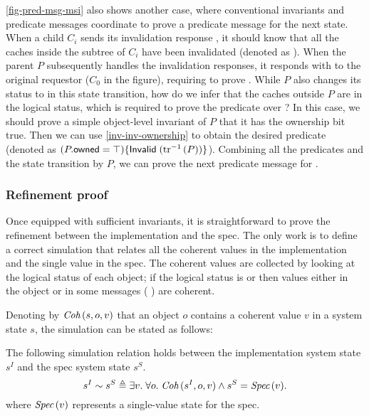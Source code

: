 \autoref{fig-pred-msg-msi} also shows another case, where conventional invariants and predicate messages coordinate to prove a predicate message for the next state.
When a child $C_i$ sends its invalidation response , it should know that all the caches inside the subtree of $C_i$ have been invalidated (denoted as {\color{myblue} }).
When the parent $P$ subsequently handles the invalidation responses, it responds with  to the original requestor ($C_0$ in the figure), requiring to prove {\color{myred} }.
While $P$ also changes its status to \stI{} in this state transition, how do we infer that the caches outside $P$ are in the logical \stI{} status, which is required to prove the predicate over {\color{myred} }?
In this case, we should prove a simple object-level invariant of $P$ that it has the ownership bit true.
Then we can use \autoref{inv-inv-ownership} to obtain the desired predicate (denoted as {\color{myblue} $(P.\textsf{owned} = \top)\{\textsf{Invalid}\;(\textrm{tr}^{-1}\,(P))\}$}).
Combining all the predicates and the state transition by $P$, we can prove the next predicate message for {\color{myred} }.

\subsubsection{Refinement proof}

Once equipped with sufficient invariants, it is straightforward to prove the refinement between the implementation and the spec.
The only work is to define a correct simulation that relates all the coherent values in the implementation and the single value in the spec.
The coherent values are collected by looking at the logical status of each object; if the logical status is \stS{} or \stM{} then values either in the object or in some messages (\eg{} ) are coherent.

Denoting by $\textit{Coh}\,(s, o, v)$ that an object $o$ contains a coherent value $v$ in a system state $s$, the simulation can be stated as follows:
\begin{theorem}
  \label{thm-msi-correct}
  The following simulation relation holds between the implementation system state $s^I$ and the spec system state $s^S$.
  \begin{displaymath}
    s^I \sim s^S \triangleq \exists v.\; \forall o.\; \textit{Coh}\,(s^I, o, v) \wedge s^S = \textit{Spec}\,(v).
  \end{displaymath}
  where $\textit{Spec}\,(v)$ represents a single-value state for the spec.
\end{theorem}

